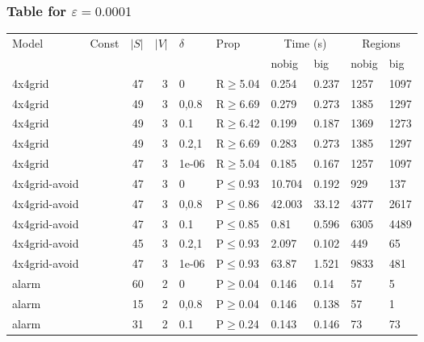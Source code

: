 \subsubsection{Table for \(\varepsilon=0.0001\)}
\begin{longtable}{llrrllllll}

        \toprule
        Model & Const & $|S|$ & $|V|$ & $\delta$ & Prop & \multicolumn{2}{c}{Time (s)} & \multicolumn{2}{c}{Regions} \\
        \cmidrule(ll){7-8} \cmidrule(ll){9-10}
        & & & & & & nobig & big & nobig & big \\
        \midrule
        
 4x4grid       &          &     	47 &   3 & 0     & R$\geq$5.04  & 0.254    & 0.237   & 1257    & 1097    \\
 4x4grid       &          &     	49 &   3 & 0,0.8 & R$\geq$6.69  & 0.279    & 0.273   & 1385    & 1297    \\
 4x4grid       &          &     	49 &   3 & 0.1   & R$\geq$6.42  & 0.199    & 0.187   & 1369    & 1273    \\
 4x4grid       &          &     	49 &   3 & 0.2,1 & R$\geq$6.69  & 0.283    & 0.273   & 1385    & 1297    \\
 4x4grid       &          &     	47 &   3 & 1e-06 & R$\geq$5.04  & 0.185    & 0.167   & 1257    & 1097    \\
 4x4grid-avoid &          &     	47 &   3 & 0     & P$\leq$0.93  & 10.704   & 0.192   & 929     & 137     \\
 4x4grid-avoid &          &     	47 &   3 & 0,0.8 & P$\leq$0.86  & 42.003   & 33.12   & 4377    & 2617    \\
 4x4grid-avoid &          &     	47 &   3 & 0.1   & P$\leq$0.85  & 0.81     & 0.596   & 6305    & 4489    \\
 4x4grid-avoid &          &     	45 &   3 & 0.2,1 & P$\leq$0.93  & 2.097    & 0.102   & 449     & 65      \\
 4x4grid-avoid &          &     	47 &   3 & 1e-06 & P$\leq$0.93  & 63.87    & 1.521   & 9833    & 481     \\
 alarm         &          &     	60 &   2 & 0     & P$\geq$0.04  & 0.146    & 0.14    & 57      & 5       \\
 alarm         &          &     	15 &   2 & 0,0.8 & P$\geq$0.04  & 0.146    & 0.138   & 57      & 1       \\
 alarm         &          &     	31 &   2 & 0.1   & P$\geq$0.24  & 0.143    & 0.146   & 73      & 73      \\

\end{longtable}
